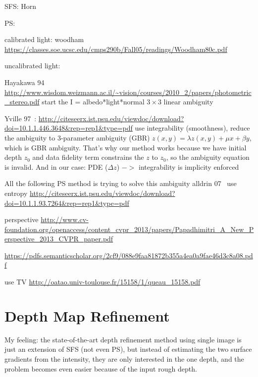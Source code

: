 SFS:
Horn

PS:

calibrated light: woodham~\cite{woodham1980photometric} \url{https://classes.soe.ucsc.edu/cmps290b/Fall05/readings/Woodham80c.pdf}

uncalibrated light:

Hayakawa 94~\cite{hayakawa1994photometric} \url{http://www.wisdom.weizmann.ac.il/~vision/courses/2010_2/papers/photometric_stereo.pdf}
start the I = albedo*light*normal $3\times3$ linear ambiguity

Yville 97~\cite{yuille1997shape}: \url{http://citeseerx.ist.psu.edu/viewdoc/download?doi=10.1.1.446.3648&rep=rep1&type=pdf}
use integrability (smoothness), reduce the ambiguity to 3-parameter ambiguity (GBR)
$z(x,y) = \lambda z(x,y) + \mu x + \beta y$, which is GBR ambiguity. That's why our method works because we have initial depth $z_0$ and data fidelity term constrains the $z$ to $z_0$, so the ambiguity equation is invalid. 
And in our case: PDE ($\Delta z$) $->$ integrability is implicity enforced

All the following PS method is trying to solve this ambiguity
alldrin 07~\cite{alldrin2007resolving} use entropy \url{http://citeseerx.ist.psu.edu/viewdoc/download?doi=10.1.1.93.7264&rep=rep1&type=pdf}

\cite{papadhimitri2013new} perspective \url{http://www.cv-foundation.org/openaccess/content_cvpr_2013/papers/Papadhimitri_A_New_Perspective_2013_CVPR_paper.pdf}

\cite{papadhimitri2014closed}\url{https://pdfs.semanticscholar.org/2cf9/088e9faa81872b355a4ea0a9fae46d3c8a08.pdf}

\cite{queau2015solving} use TV \url{http://oatao.univ-toulouse.fr/15158/1/queau_15158.pdf}



\section{Depth Map Refinement}

My feeling: the state-of-the-art depth refinement method using single image is just an extension of SFS (not even PS), but instead of estimating the two surface gradients from the intensity, they are only interested in the one depth, and the problem becomes even easier because of the input rough depth.

